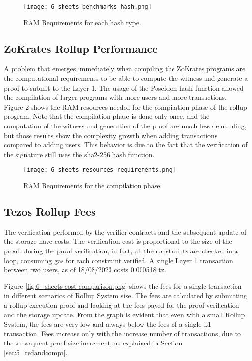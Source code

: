 \begin{figure}[ht]
	\centering
	\texttt{[image: 6\_sheets-benchmarks\_hash.png]}
	\caption[RAM Usage hash]{RAM Requirements for each hash type.}  
	\label{fig:6_sheets-benchmarks_hash.png}
  \end{figure} 

\subsection{ZoKrates Rollup Performance\label{subsec:6_zokratesperf}}

A problem that emerges immediately when compiling the ZoKrates programs are the computational requirements to be able to compute the witness and generate a proof to submit to the Layer 1. The usage of the Poseidon hash function allowed the compilation of larger programs with more users and more transactions. Figure \ref{fig:6_sheets-resources-requirements.png} shows the RAM resources needed for the compilation phase of the rollup program. Note that the compilation phase is done only once, and the computation of the witness and generation of the proof are much less demanding, but those results show the complexity growth when adding transactions compared to adding users. This behavior is due to the fact that the verification of the signature still uses the sha2-256 hash function.

\begin{figure}[ht]
	\centering
	\texttt{[image: 6\_sheets-resources-requirements.png]}
	\caption[RAM Requirements]{RAM Requirements for the compilation phase.}  
	\label{fig:6_sheets-resources-requirements.png}
  \end{figure} 

\subsection{Tezos Rollup Fees}

The verification performed by the verifier contracts and the subsequent update of the storage have costs. The verification cost is proportional to the size of the proof: during the proof verification, in fact, all the constraints are checked in a loop, consuming gas for each constraint verified. A single Layer 1 transaction between two users, as of 18/08/2023 costs 0.000518 tz.

Figure \ref{fig:6_sheets-cost-comparison.png} shows the fees for a single transaction in different scenarios of Rollup System size. The fees are calculated by submitting a rollup execution proof and looking at the fees payed for the proof verification and the storage update. From the graph is evident that even with a small Rollup System, the fees are very low and always below the fees of a single L1 transaction. Fees increase only with the increase number of transactions, due to the subsequent proof size increment, as explained in Section \ref{sec:5_redandcompr}.

